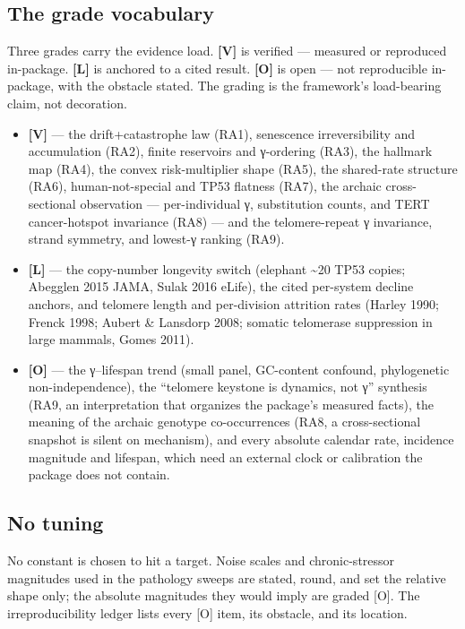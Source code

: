 \documentclass[11pt]{article}
\begin{document}
\subsection*{The grade vocabulary}

Three grades carry the evidence load. \textbf{[V]} is verified — measured or reproduced in-package. \textbf{[L]} is anchored to a cited result. \textbf{[O]} is open — not reproducible in-package, with the obstacle stated. The grading is the framework's load-bearing claim, not decoration.

\begin{itemize}[leftmargin=1.4em,itemsep=2pt,topsep=3pt]
\item \textbf{[V]} — the drift+catastrophe law (RA1), senescence irreversibility and accumulation (RA2), finite reservoirs and γ-ordering (RA3), the hallmark map (RA4), the convex risk-multiplier shape (RA5), the shared-rate structure (RA6), human-not-special and TP53 flatness (RA7), the archaic cross-sectional observation — per-individual γ, substitution counts, and TERT cancer-hotspot invariance (RA8) — and the telomere-repeat γ invariance, strand symmetry, and lowest-γ ranking (RA9).
\item \textbf{[L]} — the copy-number longevity switch (elephant \textasciitilde{}20 TP53 copies; Abegglen 2015 JAMA, Sulak 2016 eLife), the cited per-system decline anchors, and telomere length and per-division attrition rates (Harley 1990; Frenck 1998; Aubert \& Lansdorp 2008; somatic telomerase suppression in large mammals, Gomes 2011).
\item \textbf{[O]} — the γ–lifespan trend (small panel, GC-content confound, phylogenetic non-independence), the “telomere keystone is dynamics, not γ” synthesis (RA9, an interpretation that organizes the package's measured facts), the meaning of the archaic genotype co-occurrences (RA8, a cross-sectional snapshot is silent on mechanism), and every absolute calendar rate, incidence magnitude and lifespan, which need an external clock or calibration the package does not contain.
\end{itemize}

\subsection*{No tuning}

No constant is chosen to hit a target. Noise scales and chronic-stressor magnitudes used in the pathology sweeps are stated, round, and set the relative shape only; the absolute magnitudes they would imply are graded [O]. The irreproducibility ledger lists every [O] item, its obstacle, and its location.
\end{document}
